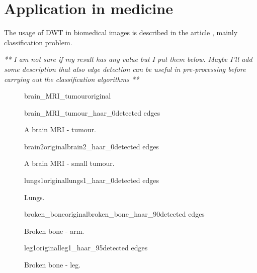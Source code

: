 \chapter{Application in medicine}

The usage of DWT in biomedical images is described in the article \cite{BiomedicalImages}, mainly classification problem.

\textit{ ** I am not sure if my result has any value but I put them below. Maybe I'll add some description that also edge detection can be useful in pre-processing before carrying out the classification algorithms **}

\begin{figure}[h]
	\centering
	\begin{subdiagram}{brain_MRI_tumour}{original}
	\end{subdiagram}
	
	\begin{subdiagram}{brain_MRI_tumour_haar_0}{detected edges}
	\end{subdiagram}
	
	\caption{A brain MRI - tumour.}
	\label{fig:brain1}
\end{figure}

\begin{figure}[h]
	\centering
	\begin{mainsubdiagrams2}{brain2}{original}{brain2_haar_0}{detected edges}
	\end{mainsubdiagrams2}
	
	\caption{A brain MRI - small tumour.}
	\label{fig:brain2}
\end{figure}

\begin{figure}[h]
	\centering
	\begin{mainsubdiagrams2}{lungs1}{original}{lungs1_haar_0}{detected edges}
	\end{mainsubdiagrams2}
	
	\caption{Lungs.}
	\label{fig:lungs}
\end{figure}

\begin{figure}[h]
	\centering
	\begin{mainsubdiagrams2}{broken_bone}{original}{broken_bone_haar_90}{detected edges}
	\end{mainsubdiagrams2}
	
	\caption{Broken bone - arm.}
	\label{fig:arm}
\end{figure}

\begin{figure}[h]
	\centering
	\begin{mainsubdiagrams2}{leg1}{original}{leg1_haar_95}{detected edges}
	\end{mainsubdiagrams2}
	
	\caption{Broken bone - leg.}
	\label{fig:leg}
\end{figure}
